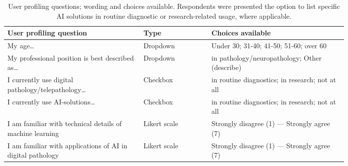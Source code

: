 \begin{table*}
    \begin{tabular}%
        {%
        >{\raggedright\arraybackslash}p{0.4\linewidth}
        l%
        >{\raggedright\arraybackslash}p{0.4\linewidth}
        }
        User profiling question & Type & Choices available \\
        \hline
        My age\dots & Dropdown &  Under 30; 31-40; 41-50; 51-60; over 60 \\
        My professional position is best described as\dots & Dropdown & [Consultant; Trainee; Technician; Researcher] in pathology/neuropathology; Other (describe) \\
        I currently use digital pathology/telepathology\dots & Checkbox & in routine diagnostics; in research; not at all \\
        I currently use AI-solutions\dots & Checkbox & in routine diagnostics; in research; not at all \\
        I am familiar with technical details of machine learning & Likert scale & Strongly disagree (1) --- Strongly agree (7)\\
        I am familiar with applications of AI in digital pathology & Likert scale & Strongly disagree (1) --- Strongly agree (7)
    \end{tabular}
    \caption{User profiling questions; wording and choices available. Respondents were presented the option to list specific AI solutions in routine diagnostic or research-related usage, where applicable.}
    \label{table:userprofiling}
\end{table*}
